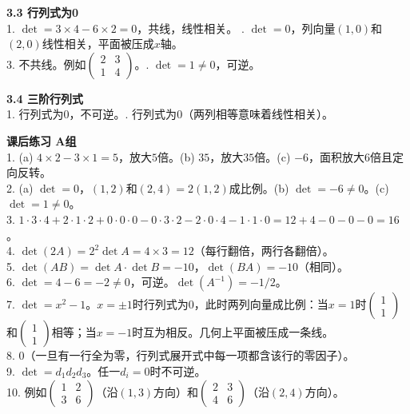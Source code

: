 \noindent\textbf{3.3 行列式为0}\\
1. $\det=3\times4-6\times2=0$，共线，线性相关。 . $\det=0$，列向量$(1,0)$和$(2,0)$线性相关，平面被压成$x$轴。\\
3. 不共线。例如$\begin{pmatrix}2&3\\1&4\end{pmatrix}$。. $\det=1\neq0$，可逆。

\noindent\textbf{3.4 三阶行列式}\\
1. 行列式为$0$，不可逆。. 行列式为$0$（两列相等意味着线性相关）。

\noindent\textbf{课后练习 A组}\\
1. (a) $4\times2-3\times1=5$，放大$5$倍。(b) $35$，放大$35$倍。(c) $-6$，面积放大$6$倍且定向反转。\\
2. (a) $\det=0$，$(1,2)$和$(2,4)=2(1,2)$成比例。(b) $\det=-6\neq0$。(c) $\det=1\neq0$。\\
3. $1\cdot3\cdot4+2\cdot1\cdot2+0\cdot0\cdot0-0\cdot3\cdot2-2\cdot0\cdot4-1\cdot1\cdot0=12+4-0-0-0=16$。\\
4. $\det(2A)=2^2\det A=4\times3=12$（每行翻倍，两行各翻倍）。\\
5. $\det(AB)=\det A\cdot\det B=-10$，$\det(BA)=-10$（相同）。\\
6. $\det=4-6=-2\neq0$，可逆。$\det(A^{-1})=-1/2$。\\
7. $\det=x^2-1$。$x=\pm1$时行列式为$0$，此时两列向量成比例：当$x=1$时$\begin{pmatrix}1\\1\end{pmatrix}$和$\begin{pmatrix}1\\1\end{pmatrix}$相等；当$x=-1$时互为相反。几何上平面被压成一条线。\\
8. $0$（一旦有一行全为零，行列式展开式中每一项都含该行的零因子）。\\
9. $\det=d_1d_2d_3$。任一$d_i=0$时不可逆。\\
10. 例如$\begin{pmatrix}1&2\\3&6\end{pmatrix}$（沿$(1,3)$方向）和$\begin{pmatrix}2&3\\4&6\end{pmatrix}$（沿$(2,4)$方向）。\\

